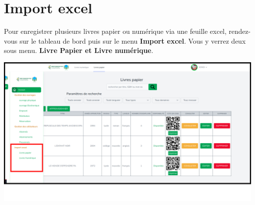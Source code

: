 \documentclass[12pt,a4paper]{article}
\begin{document}
\section{Import excel}
Pour enregistrer plusieurs livres papier ou numérique via une feuille excel, rendez-vous sur le
tableau de bord puis sur le menu \textbf{Import excel}. Vous y verrez deux sous menu.
\textbf{Livre Papier et Livre numérique}.
\begin{center}
\includegraphics[scale=0.3]{img/import_menu.png}
\end{center}
\end{document}
